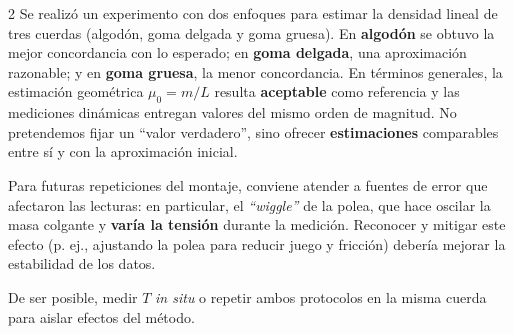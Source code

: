 \begin{multicols}{2}
Se realizó un experimento con dos enfoques para estimar la densidad lineal de tres cuerdas (algodón, goma delgada y goma gruesa). En \textbf{algodón} se obtuvo la mejor concordancia con lo esperado; en \textbf{goma delgada}, una aproximación razonable; y en \textbf{goma gruesa}, la menor concordancia. En términos generales, la estimación geométrica $\mu_{0}=m/L$ resulta \textbf{aceptable} como referencia y las mediciones dinámicas entregan valores del mismo orden de magnitud. No pretendemos fijar un “valor verdadero”, sino ofrecer \textbf{estimaciones} comparables entre sí y con la aproximación inicial.

Para futuras repeticiones del montaje, conviene atender a fuentes de error que afectaron las lecturas: en particular, el \emph{“wiggle”} de la polea, que hace oscilar la masa colgante y \textbf{varía la tensión} durante la medición. Reconocer y mitigar este efecto (p. ej., ajustando la polea para reducir juego y fricción) debería mejorar la estabilidad de los datos.

De ser posible, medir $T$ \emph{in situ} o repetir ambos protocolos en la misma cuerda para aislar efectos del método.


\end{multicols}